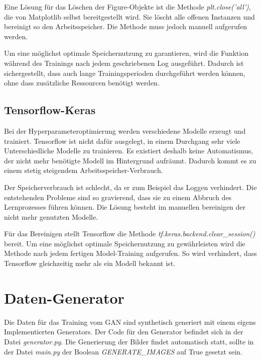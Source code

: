 Eine Lösung für das Löschen der Figure-Objekte ist die Methode \textit{plt.close('all')}, die von Matplotlib selbst bereitgestellt wird.
Sie löscht alle offenen Instanzen und bereinigt so den Arbeitsspeicher.
Die Methode muss jedoch manuell aufgerufen werden.
\newline

Um eine möglichst optimale Speichernutzung zu garantieren, wird die Funktion während des Trainings nach jedem geschriebenen Log ausgeführt.
Dadurch ist sichergestellt, dass auch lange Trainingsperioden durchgeführt werden können, ohne dass zusätzliche Ressourcen benötigt werden.

\subsection{Tensorflow-Keras}
Bei der Hyperparameteroptimierung werden verschiedene Modelle erzeugt und trainiert.
Tensorflow ist nicht dafür ausgelegt, in einem Durchgang sehr viele Unterschiedliche Modelle zu trainieren.
Es existiert deshalb keine Automatismus, der nicht mehr benötigte Modell im Hintergrund aufräumt.
Dadurch kommt es zu einem stetig steigendem Arbeitsspeicher-Verbrauch.
\newline

Der Speicherverbrauch ist schlecht, da er zum Beispiel das Loggen verhindert.
Die entstehenden Probleme sind so gravierend, dass sie zu einem Abbruch des Lernprozesses führen können.
Die Lösung besteht im manuellen bereinigen der nicht mehr genutzten Modelle.
\newline

Für das Bereinigen stellt Tensorflow die Methode \textit{tf.keras.backend.clear\_session()} bereit.
Um eine möglichst optimale Speichernutzung zu gewährleisten wird die Methode nach jedem fertigen Model-Training aufgerufen.
So wird verhindert, dass Tensorflow gleichzeitig mehr als ein Modell bekannt ist.

\section{Daten-Generator}
Die Daten für das Training vom GAN sind synthetisch generiert mit einem eigens Implementierten Generators.
Der Code für den Generator befindet sich in der Datei \textit{generator.py}.
Die Generierung der Bilder findet automatisch statt, sollte in der Datei \textit{main.py} der Boolean \textit{GENERATE\_IMAGES} auf True gesetzt sein.
\newline

